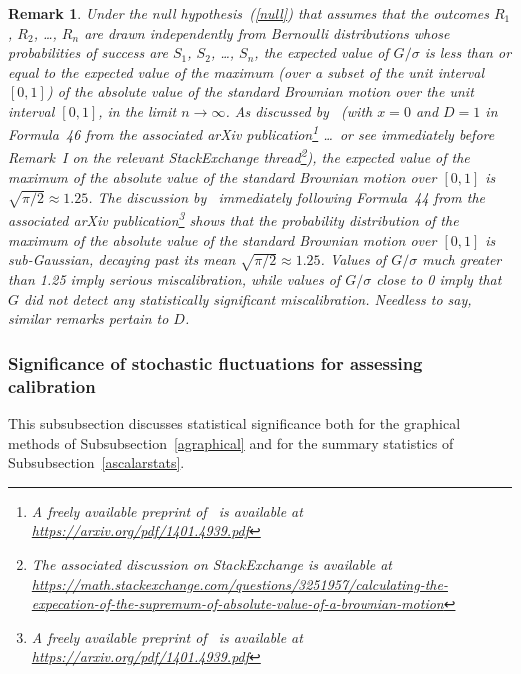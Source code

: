 \documentclass{article}
\newtheorem{remark1}[theorem]{Remark}
\newenvironment{remark}{\begin{remark1} \rm}{\end{remark1}}
\begin{document}
\begin{remark}
\label{proofs}
Under the null hypothesis~(\ref{null}) that assumes that the outcomes
$R_1$, $R_2$, \dots, $R_n$ are drawn independently from Bernoulli distributions
whose probabilities of success are $S_1$, $S_2$, \dots, $S_n$,
the expected value of $G/\sigma$ is less than or equal to
the expected value of the maximum (over a subset of the unit interval $[0, 1]$)
of the absolute value of the standard Brownian motion
over the unit interval $[0, 1]$, in the limit $n \to \infty$.
As discussed by~\cite{masoliver} (with $x = 0$ and $D = 1$ in Formula~46
from the associated arXiv publication\footnote{A freely available preprint
of~\cite{masoliver} is available at \url{https://arxiv.org/pdf/1401.4939.pdf}}
\dots\ or see immediately before Remark~I
on the relevant StackExchange thread\footnote{The associated discussion
on StackExchange is available at
{\expandafter\def\expandafter\UrlBreaks\expandafter{\UrlBreaks\do\/\do-}
\url{https://math.stackexchange.com/questions/3251957/calculating-the-expecation-of-the-supremum-of-absolute-value-of-a-brownian-motion}}}),
the expected value of the maximum of the absolute value
of the standard Brownian motion over $[0, 1]$ is $\sqrt{\pi/2} \approx 1.25$.
The discussion by~\cite{masoliver} immediately following Formula~44
from the associated arXiv publication\footnote{A freely available preprint
of~\cite{masoliver} is available at \url{https://arxiv.org/pdf/1401.4939.pdf}}
shows that the probability distribution of the maximum of the absolute value
of the standard Brownian motion over $[0, 1]$ is sub-Gaussian,
decaying past its mean $\sqrt{\pi/2} \approx 1.25$.
Values of $G/\sigma$ much greater than 1.25 imply serious miscalibration,
while values of $G/\sigma$ close to 0 imply that $G$ did not detect
any statistically significant miscalibration.
Needless to say, similar remarks pertain to $D$.
\end{remark}


\subsubsection{Significance of stochastic fluctuations
for assessing calibration}
\label{asignificance}

This subsubsection discusses statistical significance
both for the graphical methods of Subsubsection~\ref{agraphical}
and for the summary statistics of Subsubsection~\ref{ascalarstats}.
\end{document}
